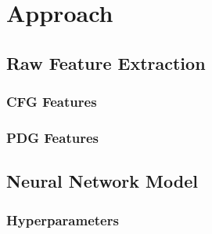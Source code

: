 \chapter{Approach}
\section{Raw Feature Extraction}
\subsection{CFG Features}
\subsection{PDG Features}
\section{Neural Network Model}
\subsection{Hyperparameters}